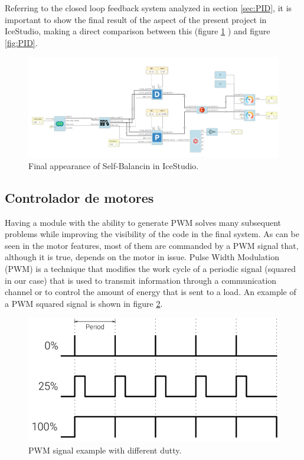 Referring to the closed loop feedback system analyzed in section \ref{sec:PID}, it is important to show the final result of the aspect of the present project in IceStudio, making a direct comparison between this (figure \ref{fig:finalIceStudio} ) and figure \ref{fig:PID}.
\newpage
\begin{figure}[H]
	\center
	\includegraphics[scale=0.5, angle=90]{imagenes/Balancing_robot/finalIceStudio}
	\caption{Final appearance of Self-Balancin in IceStudio.}
	\label{fig:finalIceStudio}
\end{figure}

\subsection{Controlador de motores} \label{sec:driver_motores}
Having a module with the ability to generate PWM solves many subsequent problems while improving the visibility of the code in the final system. As can be seen in the motor features, most of them are commanded by a PWM signal that, although it is true, depends on the motor in issue. \newline
Pulse Width Modulation (PWM) is a technique that modifies the work cycle of a periodic signal (squared in our case) that is used to transmit information through a communication channel or to control the amount of energy that is sent to a load. An example of a PWM squared signal is shown in figure \ref{fig:pwm_example}.

\begin{figure}[H]
	\center
	\includegraphics[trim = 0mm 0cm 0mm 0cm, clip,scale=0.4]{imagenes/Balancing_robot/pwm_example.png}
	\caption{PWM signal example with different dutty.}
	\label{fig:pwm_example}
\end{figure}



